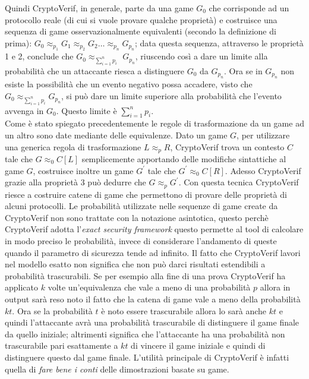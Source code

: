 \documentclass[a4paper,openright,twoside,12pt]{report}
\begin{document}
Quindi CryptoVerif, in generale, parte da una game $G_0$ che corrisponde ad un protocollo reale (di cui si vuole provare qualche propriet\`a) e costruisce una sequenza di game 
osservazionalmente equivalenti (secondo la definizione di prima): $G_0 \approx_{p_1} G_1 \approx_{p_2} G_2 \dots \approx_{p_n} G_{p_{n}} $; data questa sequenza, 
attraverso le propriet\`a 1 e 2, conclude che $G_0  \approx_{\sum_{i=1}^{n}{p_i}}$ $G_{p_{n}} $, riuscendo cos\`i a dare un limite alla probabilit\`a che un attaccante riesca a distinguere
$G_0$ da $G_{p_{n}}$. Ora se in $G_{p_{n}}$ non esiste la possibilit\`a che un evento negativo possa accadere, visto che $G_0  \approx_{\sum_{i=1}^{n}{p_i}} G_{p_{n}} $, si pu\`o dare un limite superiore alla probabilit\`a che l'evento avvenga in $G_0$.
Questo limite \`e $\sum_{i=1}^{n}p_i$.\\Come \`e stato spiegato precedentemente le regole di trasformazione da un game ad un altro sono date mediante delle equivalenze. 
Dato un game $G$, per utilizzare una generica regola di trasformazione  $L \approx_p R$, CryptoVerif trova un contesto $C$ tale che $G \approx_0 C[L] $ semplicemente 
apportando delle modifiche sintattiche al game $G$, costruisce inoltre un game $G^{'}$ tale che $G^{'} \approx_0 C[R]$. Adesso CryptoVerif grazie alla propriet\`a 3 pu\`o dedurre che $G \approx_p G^{'}$. Con questa tecnica CryptoVerif riesce a costruire catene
di game che permettono di provare delle propriet\`a di alcuni protocolli.
Le probabilit\`a utilizzate nelle sequenze di game create da CryptoVerif non sono trattate con la notazione asintotica, questo perch\`e
CryptoVerif adotta l'\emph{exact security framework} questo permette al tool di calcolare in modo preciso le probabilit\`a, invece di 
considerare l'andamento di queste quando il parametro di sicurezza tende ad infinito.
Il fatto che CryptoVerif lavori nel modello esatto non significa che non pu\`o darci risultati estendibili a probabilit\`a trascurabili.
Se per esempio alla fine di una prova CryptoVerif ha applicato $k$ volte un'equivalenza che vale a meno di una probabilit\`a $p$ allora
in output sar\`a reso noto il fatto che la catena di game vale a meno della probabilit\`a $kt$. Ora se la probabilit\`a $t$ \`e noto essere
trascurabile allora lo sar\`a anche $kt$ e quindi l'attaccante avr\`a una probabilit\`a trascurabile di distinguere il game finale da quello iniziale; 
altrimenti significa che l'attaccante ha una probabilit\`a non trascurabile pari esattamente a $kt$ di vincere il game iniziale e quindi
di distinguere questo dal game finale. 
L'utilit\`a principale di CryptoVerif \`e infatti quella di \emph{fare bene i conti} delle dimostrazioni basate su game.
\end{document}
